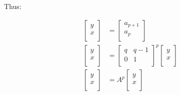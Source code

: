 \documentclass[paper.tex]{subfiles}
\begin{document}
Thus:

\begin{align*}
\left[ \begin{array}{ccc}
y \\
x \\
\end{array} \right] 
&=
\left[ \begin{array}{ccc}
a_{p+1} \\
a_{p} \\
\end{array} \right] \\
\left[ \begin{array}{ccc}
y \\
x \\
\end{array} \right] 
&=
\left[ \begin{array}{ccc}
q & q-1 \\
0 & 1 \\
\end{array} \right] ^{p}
\left[ \begin{array}{ccc}
y \\
x \\
\end{array} \right] \\
\left[ \begin{array}{ccc}
y \\
x \\
\end{array} \right] 
&=
A^{p}
\left[ \begin{array}{ccc}
y \\
x \\
\end{array} \right] \\
\end{align*}
\end{document}
